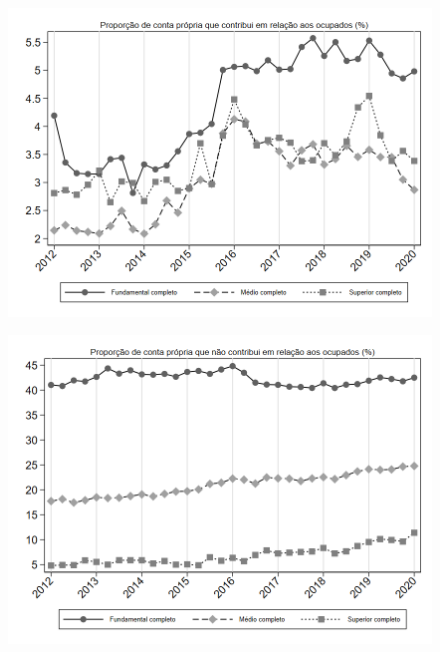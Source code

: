 \begin{frame}[label=_composicao_demografica_educacao_prop_cpropriaC]{}
\textit{\hyperlink{_composicao_demografica_educacao}{}}
\begin{figure}
  \centering
  \includegraphics[width=1.0\linewidth]{../../analysis/output/composicao_demografica/educacao/_composicao_demografica_educacao_prop_cpropriaC.png}
  \caption{}
  \label{fig:_composicao_demografica_educacao_prop_cpropriaC}
\end{figure}
\end{frame}

\begin{frame}[label=_composicao_demografica_educacao_prop_cpropriaNc]{}
\textit{\hyperlink{_composicao_demografica_educacao}{}}
\begin{figure}
  \centering
  \includegraphics[width=1.0\linewidth]{../../analysis/output/composicao_demografica/educacao/_composicao_demografica_educacao_prop_cpropriaNc.png}
  \caption{}
  \label{fig:_composicao_demografica_educacao_prop_cpropriaNc}
\end{figure}
\end{frame}